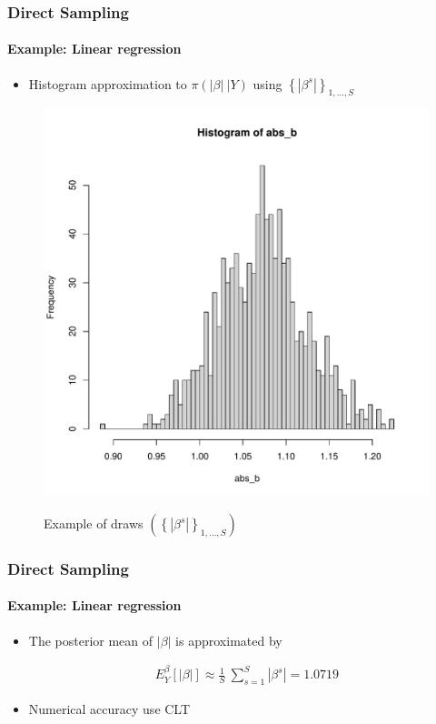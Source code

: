 \documentclass[
  shownotes,
  xcolor={svgnames},
  hyperref={colorlinks,citecolor=DarkBlue,linkcolor=DarkRed,urlcolor=DarkBlue}
  , aspectratio=169]{beamer}
\begin{document}
\begin{frame}[fragile]
\frametitle{Direct Sampling}  
\framesubtitle{Example: Linear regression}

\begin{itemize}
\item Histogram approximation to $\pi\left( \left| \beta \right|\ |Y \right)$ using $\left\{ \left| \beta^{s} \right| \right\}_{1,\ldots,S}$

  \end{itemize}

\begin{figure}[H] \centering
  \centering
  \caption{Example of draws $\left( \left\{ |\beta^{s}| \right\}_{1,\ldots,S} \right)$}
  \includegraphics[scale=0.25]{figures/hist}
  \\
  \tiny 
\end{figure}
\end{frame}
\begin{frame}[fragile]
\frametitle{Direct Sampling}  
\framesubtitle{Example: Linear regression}

\begin{itemize}
\item The posterior mean of $\left| \beta \right|$ is approximated by

\begin{align}
E_{Y}^{\beta}\left\lbrack \left| \beta \right| \right\rbrack \approx \frac{1}{S}\ \sum_{s = 1}^{S}{\left| \beta^{s} \right| = 1.0719}
\end{align}

\item Numerical accuracy  use CLT
\end{itemize}


 \end{frame}
\end{document}
